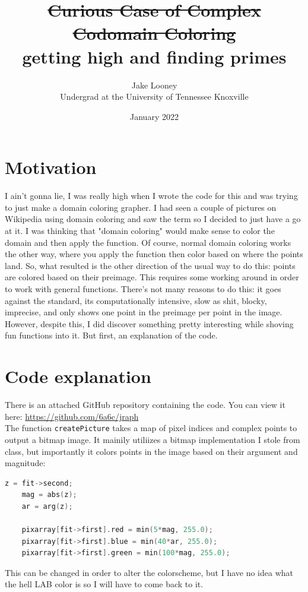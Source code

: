 \documentclass[letterpaper,12pt]{article}
\begin{document}
\title{\sout{Curious Case of Complex Codomain Coloring}\\ getting high and finding primes}
\author{Jake Looney\\ Undergrad at the University of Tennessee Knoxville}
\date{January 2022}
\maketitle

\tableofcontents
\newpage
{}

\section{Motivation}
I ain't gonna lie, I was really high when I wrote the code for this and was trying to just make a domain coloring grapher.
I had seen a couple of pictures on Wikipedia using domain coloring and saw the term so I decided to just have a go at it.
I was thinking that "domain coloring" would make sense to color the domain and then apply the function.
Of course, normal domain coloring works the other way, where you apply the function then color based on where the points land.
So, what resulted is the other direction of the usual way to do this: points are colored based on their preimage.
This requires some working around in order to work with general functions.
There's not many reasons to do this: it goes against the standard, its computationally intensive, slow as shit, blocky, imprecise, and only shows one point in the preimage per point in the image.
However, despite this, I did discover something pretty interesting while shoving fun functions into it. But first, an explanation of the code.

\section{Code explanation}
There is an attached GitHub repository containing the code. You can view it here: \url{https://github.com/6a6c/jraph} \\

The function \verb|createPicture| takes a map of pixel indices and complex points to output a bitmap image.
It mainily utiliizes a bitmap implementation I stole from class, but importantly it colors points in the image based on their argument and magnitude:
\begin{lstlisting}[language=c++]
    z = fit->second;
    mag = abs(z);
    ar = arg(z);

    pixarray[fit->first].red = min(5*mag, 255.0);
    pixarray[fit->first].blue = min(40*ar, 255.0);
    pixarray[fit->first].green = min(100*mag, 255.0);
\end{lstlisting}
This can be changed in order to alter the colorscheme, but I have no idea what the hell LAB color is so I will have to come back to it.\\
\end{document}
